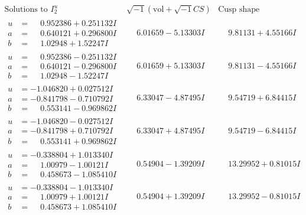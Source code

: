 \documentclass[1p]{elsarticle_modified}
\theoremstyle{definition}
\newcommand{\I}{\sqrt{-1}}
\begin{document}
$$\begin{array}{c|c|c}  
\text{Solutions to }I^u_{2}& \I (\text{vol} + \sqrt{-1}CS) & \text{Cusp shape}\\
 \hline 
\begin{aligned}
u &= \phantom{-}0.952386 + 0.251132 I \\
a &= \phantom{-}0.640121 + 0.296800 I \\
b &= \phantom{-}1.02948 + 1.52247 I\end{aligned}
 & \phantom{-}6.01659 - 5.13303 I & \phantom{-}9.81131 + 4.55166 I \\ \hline\begin{aligned}
u &= \phantom{-}0.952386 - 0.251132 I \\
a &= \phantom{-}0.640121 - 0.296800 I \\
b &= \phantom{-}1.02948 - 1.52247 I\end{aligned}
 & \phantom{-}6.01659 + 5.13303 I & \phantom{-}9.81131 - 4.55166 I \\ \hline\begin{aligned}
u &= -1.046820 + 0.027512 I \\
a &= -0.841798 - 0.710792 I \\
b &= \phantom{-}0.553141 - 0.969862 I\end{aligned}
 & \phantom{-}6.33047 - 4.87495 I & \phantom{-}9.54719 + 6.84415 I \\ \hline\begin{aligned}
u &= -1.046820 - 0.027512 I \\
a &= -0.841798 + 0.710792 I \\
b &= \phantom{-}0.553141 + 0.969862 I\end{aligned}
 & \phantom{-}6.33047 + 4.87495 I & \phantom{-}9.54719 - 6.84415 I \\ \hline\begin{aligned}
u &= -0.338804 + 1.013340 I \\
a &= \phantom{-}1.00979 - 1.00121 I \\
b &= \phantom{-}0.458673 - 1.085410 I\end{aligned}
 & \phantom{-}0.54904 - 1.39209 I & \phantom{-}13.29952 + 0.81015 I \\ \hline\begin{aligned}
u &= -0.338804 - 1.013340 I \\
a &= \phantom{-}1.00979 + 1.00121 I \\
b &= \phantom{-}0.458673 + 1.085410 I\end{aligned}
 & \phantom{-}0.54904 + 1.39209 I & \phantom{-}13.29952 - 0.81015 I \\ \hline\begin{aligned}

\end{aligned}
\end{array}$$
\end{document}
